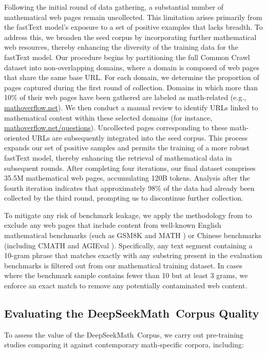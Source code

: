Following the initial round of data gathering, a substantial number of mathematical web pages remain uncollected. This limitation arises primarily from the fastText model's exposure to a set of positive examples that lacks breadth. To address this, we broaden the seed corpus by incorporating further mathematical web resources, thereby enhancing the diversity of the training data for the fastText model. Our procedure begins by partitioning the full Common Crawl dataset into non-overlapping domains, where a domain is composed of web pages that share the same base URL. For each domain, we determine the proportion of pages captured during the first round of collection. Domains in which more than 10\% of their web pages have been gathered are labeled as math-related (e.g., \url{mathoverflow.net}).
We then conduct a manual review to identify URLs linked to mathematical content within these selected domains (for instance, \url{mathoverflow.net/questions}).
Uncollected pages corresponding to these math-oriented URLs are subsequently integrated into the seed corpus. This process expands our set of positive samples and permits the training of a more robust fastText model, thereby enhancing the retrieval of mathematical data in subsequent rounds. After completing four iterations, our final dataset comprises 35.5M mathematical web pages, accumulating 120B tokens. Analysis after the fourth iteration indicates that approximately 98\% of the data had already been collected by the third round, prompting us to discontinue further collection.

To mitigate any risk of benchmark leakage, we apply the methodology from \cite{deepseek-coder} to exclude any web pages that include content from well-known English mathematical benchmarks (such as GSM8K \citep{gsm8k} and MATH \citep{MATH}) or Chinese benchmarks (including CMATH \citep{wei2023cmath} and AGIEval \citep{agieval}). Specifically, any text segment containing a 10-gram phrase that matches exactly with any substring present in the evaluation benchmarks is filtered out from our mathematical training dataset. In cases where the benchmark sample contains fewer than 10 but at least 3 grams, we enforce an exact match to remove any potentially contaminated web content.

\subsection{Evaluating the DeepSeekMath~Corpus Quality}

To assess the value of the DeepSeekMath~Corpus, we carry out pre-training studies comparing it against contemporary math-specific corpora, including:

